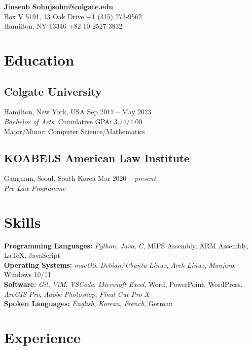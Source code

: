 \documentclass[11pt, letterpaper]{article}
\begin{document}
\begin{flushleft}
    \textbf{\Large Jinseob Sohn}\hfill \textbf{jsohn@colgate.edu} \\
        Box V 5191, 13 Oak Drive \hfill +1 (315) 273-9562 \\
        Hamilton, NY 13346 \hfill +82 10-2527-3832 \\
\end{flushleft}

    
\section{Education}
\subsection{Colgate University} 
\noindent Hamilton, New York, USA \hfill Sep 2017 – May 2023\\
\textit{Bachelor of Arts}, Cumulative GPA: 3.74/4.00\\
Major/Minor: Computer Science/Mathematics
\subsection{KOABELS American Law Institute} 
\noindent Gangnam, Seoul, South Korea \hfill Mar 2020 – \textit{present} \\
\textit{Pre-Law Programme}

\section{Skills}
\noindent \textbf{Programming Languages:} \emph{Python}, \emph{Java}, \emph{C}, MIPS Assembly, ARM Assembly, \LaTeX, JavaScript\\
\noindent \textbf{Operating Systems:} \emph{macOS}, \emph{Debian/Ubuntu Linux}, \emph{Arch Linux}, \emph{Manjaro}, Windows 10/11\\
\textbf{Software: } \emph{Git}, \emph{ViM}, \emph{VSCode}, \emph{Microsoft Excel}, Word, PowerPoint,  WordPress, \emph{ArcGIS Pro}, \emph{Adobe Photoshop}, \emph{Final Cut Pro X}\\
\textbf{Spoken Languages:} \emph{English}, \emph{Korean}, \emph{French}, German
\section{Experience}
\end{document}
